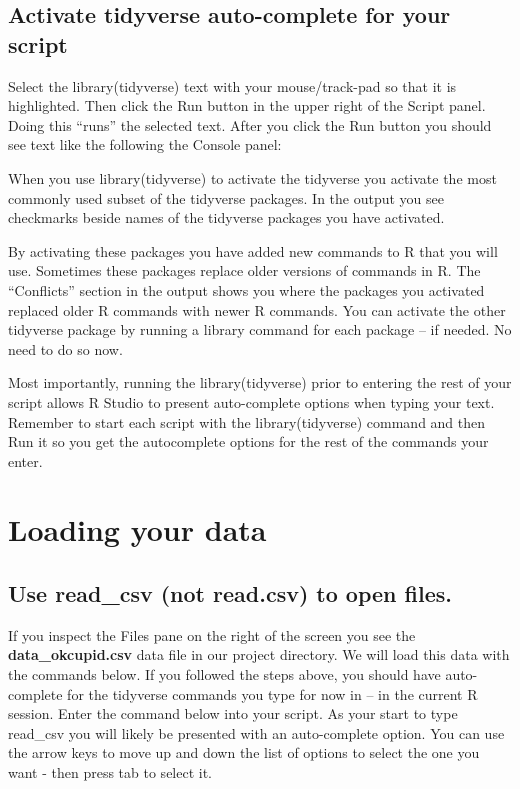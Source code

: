 \documentclass[
]{krantz}
\begin{document}
\hypertarget{activate-tidyverse-auto-complete-for-your-script}{%
\subsection{Activate tidyverse auto-complete for your script}\label{activate-tidyverse-auto-complete-for-your-script}}

Select the library(tidyverse) text with your mouse/track-pad so that it is highlighted. Then click the Run button in the upper right of the Script panel. Doing this ``runs'' the selected text. After you click the Run button you should see text like the following the Console panel:

When you use library(tidyverse) to activate the tidyverse you activate the most commonly used subset of the tidyverse packages. In the output you see checkmarks beside names of the tidyverse packages you have activated.

By activating these packages you have added new commands to R that you will use. Sometimes these packages replace older versions of commands in R. The ``Conflicts'' section in the output shows you where the packages you activated replaced older R commands with newer R commands. You can activate the other tidyverse package by running a library command for each package -- if needed. No need to do so now.

Most importantly, running the library(tidyverse) prior to entering the rest of your script allows R Studio to present auto-complete options when typing your text. Remember to start each script with the library(tidyverse) command and then Run it so you get the autocomplete options for the rest of the commands your enter.

\hypertarget{loading-your-data}{%
\section{Loading your data}\label{loading-your-data}}

\hypertarget{use-read_csv-not-read.csv-to-open-files.}{%
\subsection{Use read\_csv (not read.csv) to open files.}\label{use-read_csv-not-read.csv-to-open-files.}}

If you inspect the Files pane on the right of the screen you see the \textbf{data\_okcupid.csv} data file in our project directory. We will load this data with the commands below. If you followed the steps above, you should have auto-complete for the tidyverse commands you type for now in -- in the current R session. Enter the command below into your script. As your start to type read\_csv you will likely be presented with an auto-complete option. You can use the arrow keys to move up and down the list of options to select the one you want - then press tab to select it.
\end{document}
